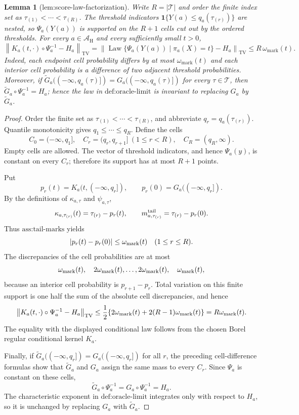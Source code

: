 \documentclass{article}
\newtheorem{lemma}{Lemma}
\begin{document}
\begin{lemma}[lem:score-law-factorization]\label{lem:score-law-factorization}
Write \(R=|\mathcal T|\) and order the finite index set as \(\tau_{(1)}<\cdots<\tau_{(R)}\). The threshold indicators \(\mathbf1\{Y(a)\le q_a(\tau_{(r)})\}\) are nested, so \(\Psi_a(Y(a))\) is supported on the \(R+1\) cells cut out by the ordered thresholds. For every \(a\in\mathcal A_{\mathrm H}\) and every sufficiently small \(t>0\), \[\left\|K_a(t,\cdot)\circ\Psi_a^{-1}-H_a\right\|_{\mathrm{TV}}=\left\|\operatorname{Law}\{\Psi_a(Y(a))\mid\pi_a(X)=t\}-H_a\right\|_{\mathrm{TV}}\le R\,\omega_{\mathrm{mark}}(t).\] Indeed, each endpoint cell probability differs by at most \(\omega_{\mathrm{mark}}(t)\) and each interior cell probability is a difference of two adjacent threshold probabilities. Moreover, if \(\widetilde G_a((-\infty,q_a(\tau)])=G_a((-\infty,q_a(\tau)])\) for every \(\tau\in\mathcal T\), then \(\widetilde G_a\circ\Psi_a^{-1}=H_a\); hence the law in \(\text{def:oracle-limit}\) is invariant to replacing \(G_a\) by \(\widetilde G_a\).
\end{lemma}
\begin{proof}
Order the finite set as \(\tau_{(1)}<\cdots<\tau_{(R)}\), and abbreviate \(q_r=q_a(\tau_{(r)})\).  Quantile monotonicity gives \(q_1\le\cdots\le q_R\).  Define the cells
\[
C_0=(-\infty,q_1],\quad
C_r=(q_r,q_{r+1}]\ (1\le r<R),\quad
C_R=(q_R,\infty).
\]
Empty cells are allowed.  The vector of threshold indicators, and hence \(\Psi_a(y)\), is constant on every \(C_r\); therefore its support has at most \(R+1\) points.

Put
\[
p_r(t)=K_a(t,(-\infty,q_r]),\qquad
p_r(0)=G_a((-\infty,q_r]).
\]
By the definitions of \(\kappa_{a,\tau}\) and \(\psi_{a,\tau}\),
\[
\kappa_{a,\tau_{(r)}}(t)=\tau_{(r)}-p_r(t),
\qquad
m^{\rm tail}_{a,\tau_{(r)}}=\tau_{(r)}-p_r(0).
\]
Thus \(\text{ass:tail-marks}\) yields
\[
|p_r(t)-p_r(0)|\le\omega_{\rm mark}(t)
\quad(1\le r\le R).
\]
The discrepancies of the cell probabilities are at most
\[
\omega_{\rm mark}(t),\quad
2\omega_{\rm mark}(t),\ldots,2\omega_{\rm mark}(t),\quad
\omega_{\rm mark}(t),
\]
because an interior cell probability is \(p_{r+1}-p_r\).  Total variation on this finite support is one half the sum of the absolute cell discrepancies, and hence
\[
\left\|K_a(t,\cdot)\circ\Psi_a^{-1}-H_a\right\|_{\rm TV}
\le\frac12\{2\omega_{\rm mark}(t)+2(R-1)\omega_{\rm mark}(t)\}
=R\omega_{\rm mark}(t).
\]
The equality with the displayed conditional law follows from the chosen Borel regular conditional kernel \(K_a\).

Finally, if \(\widetilde G_a((-\infty,q_r])=G_a((-\infty,q_r])\) for all \(r\), the preceding cell-difference formulas show that \(\widetilde G_a\) and \(G_a\) assign the same mass to every \(C_r\).  Since \(\Psi_a\) is constant on these cells,
\[
\widetilde G_a\circ\Psi_a^{-1}
=G_a\circ\Psi_a^{-1}
=H_a.
\]
The characteristic exponent in \(\text{def:oracle-limit}\) integrates only with respect to \(H_a\), so it is unchanged by replacing \(G_a\) with \(\widetilde G_a\).
\end{proof}
\end{document}
